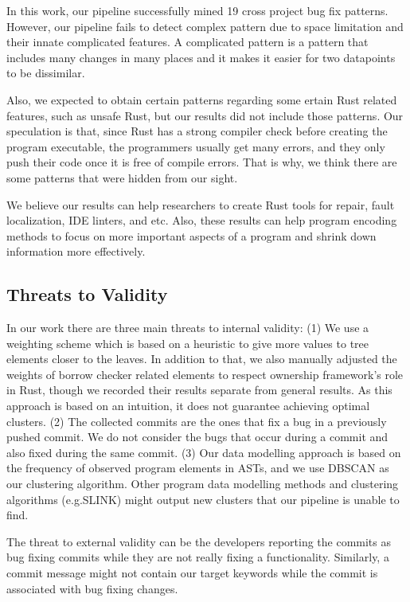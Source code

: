 In this work, our pipeline successfully mined 19 cross project bug fix patterns. However, our pipeline fails to detect complex pattern due to space limitation and their innate complicated features. A complicated pattern is a pattern that includes many changes in many places and it makes it easier for two datapoints to be dissimilar. 

Also, we expected to obtain certain patterns regarding some ertain Rust related features, such as unsafe Rust, but our results did not include those patterns. Our speculation is that, since Rust has a strong compiler check before creating the program executable, the programmers usually get many errors, and they only push their code once it is free of compile errors. That is why, we think there are some patterns that were hidden from our sight.

We believe our results can help researchers to create Rust tools for repair, fault localization, IDE linters, and etc. Also, these results can help program encoding methods to focus on more important aspects of a program and shrink down information more effectively.

\subsection{Threats to Validity}

In our work there are three main threats to internal validity: (1) We use a weighting scheme which is based on a heuristic to give more values to tree elements closer to the leaves. In addition to that, we also manually adjusted the weights of borrow checker related elements to respect ownership framework's role in Rust, though we recorded their results separate from general results. As this approach is based on an intuition, it does not guarantee achieving optimal clusters. (2) The collected commits are the ones that fix a bug in a previously pushed commit. We do not consider the bugs that occur during a commit and also fixed during the same commit. (3) Our data modelling approach is based on the frequency of observed program elements in ASTs, and we use DBSCAN as our clustering algorithm. Other program data modelling methods and clustering algorithms (e.g.SLINK) might output new clusters that our pipeline is unable to find. 

The threat to external validity can be the developers reporting the commits as bug fixing commits while they are not really fixing a functionality. Similarly, a commit message might not contain our target keywords while the commit is associated with bug fixing changes.
